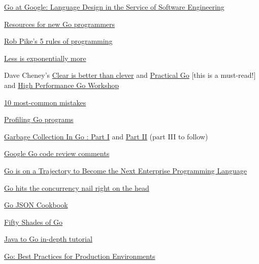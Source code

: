 \documentclass[12pt,notitlepage]{article}
\begin{document}
\href{https://talks.golang.org/2012/splash.article}{Go at Google: Language Design in the Service of Software Engineering}

\href{https://dave.cheney.net/resources-for-new-go-programmers}{Resources for new Go programmers}

\href{https://users.ece.utexas.edu/~adnan/pike.html}{Rob Pike's 5 rules of programming}

\href{https://commandcenter.blogspot.com/2012/06/less-is-exponentially-more.html}{Less is exponentially more}

Dave Cheney's \href{https://dave.cheney.net/paste/clear-is-better-than-clever.pdf}{Clear is better than clever}
and \href{https://dave.cheney.net/practical-go/presentations/qcon-china.html}{\color{red} Practical Go} [this is a must-read!]
and \href{https://dave.cheney.net/high-performance-go-workshop/gopherchina-2019.html}{High Performance Go Workshop}

\href{https://medium.com/@teivah/the-top-10-most-common-mistakes-ive-seen-in-go-projects-4b79d4f6cd65}{10 most-common mistakes}

\href{https://blog.golang.org/profiling-go-programs}{Profiling Go programs}

\href{https://www.ardanlabs.com/blog/2018/12/garbage-collection-in-go-part1-semantics.html}%
{Garbage Collection In Go : Part I} and 
\href{https://www.ardanlabs.com/blog/2019/05/garbage-collection-in-go-part2-gctraces.html}{Part II} (part III to follow)

\href{https://github.com/golang/go/wiki/CodeReviewComments}{Google Go code review comments}

\href{https://hackernoon.com/go-is-on-a-trajectory-to-become-the-next-enterprise-programming-language-3b75d70544e}%
{Go is on a Trajectory to Become the Next Enterprise Programming Language}

\href{https://eli.thegreenplace.net/2018/go-hits-the-concurrency-nail-right-on-the-head/}%
{Go hits the concurrency nail right on the head}

\href{https://eli.thegreenplace.net/2019/go-json-cookbook/}{Go JSON Cookbook}

\href{http://devs.cloudimmunity.com/gotchas-and-common-mistakes-in-go-golang/index.html}{\color{red} Fifty Shades of Go}

\href{https://yourbasic.org/golang/go-java-tutorial/}{Java to Go in-depth tutorial}

\href{https://peter.bourgon.org/go-in-production/}{Go: Best Practices for Production Environments}
\end{document}
